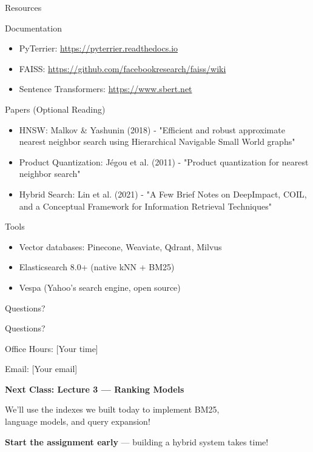 \documentclass[aspectratio=169]{beamer}
\begin{document}
\begin{frame}[shrink=10]{Resources}
\begin{block}{Documentation}
\begin{itemize}
    \item PyTerrier: \url{https://pyterrier.readthedocs.io}
    \item FAISS: \url{https://github.com/facebookresearch/faiss/wiki}
    \item Sentence Transformers: \url{https://www.sbert.net}
\end{itemize}
\end{block}

\begin{block}{Papers (Optional Reading)}
\begin{itemize}
    \item HNSW: Malkov \& Yashunin (2018) - "Efficient and robust approximate nearest neighbor search using Hierarchical Navigable Small World graphs"
    \item Product Quantization: Jégou et al. (2011) - "Product quantization for nearest neighbor search"
    \item Hybrid Search: Lin et al. (2021) - "A Few Brief Notes on DeepImpact, COIL, and a Conceptual Framework for Information Retrieval Techniques"
\end{itemize}
\end{block}

\begin{block}{Tools}
\begin{itemize}
    \item Vector databases: Pinecone, Weaviate, Qdrant, Milvus
    \item Elasticsearch 8.0+ (native kNN + BM25)
    \item Vespa (Yahoo's search engine, open source)
\end{itemize}
\end{block}
\end{frame}

\begin{frame}[shrink=10]{Questions?}
\begin{center}
\Huge Questions?

\vspace{2em}

\Large
Office Hours: [Your time]

\vspace{1em}

Email: [Your email]

\vspace{2em}

\normalsize
\textbf{Next Class: Lecture 3 --- Ranking Models}

\vspace{0.5em}

We'll use the indexes we built today to implement BM25, \\
language models, and query expansion!

\vspace{1em}

\textbf{Start the assignment early} --- building a hybrid system takes time!
\end{center}
\end{frame}
\end{document}

